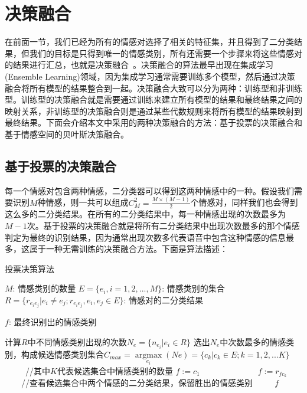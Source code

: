 \section{决策融合}
\label{sec:decision_fusion}
在前面一节，我们已经为所有的情感对选择了相关的特征集，并且得到了二分类结果，但我们的目标是只得到唯一的情感类别，所有还需要一个步骤来将这些情感对的结果进行汇总，也就是决策融合~\cite{Dasarathy1994Decision}。决策融合的算法最早出现在集成学习(Ensemble Learning)领域，因为集成学习通常需要训练多个模型，然后通过决策融合将所有模型的结果整合到一起。决策融合大致可以分为两种：训练型和非训练型。训练型的决策融合就是需要通过训练来建立所有模型的结果和最终结果之间的映射关系，非训练型的决策融合则是通过某些代数规则来将所有模型的结果映射到最终结果。下面会介绍本文中采用的两种决策融合的方法：基于投票的决策融合和基于情感空间的贝叶斯决策融合。

\subsection{基于投票的决策融合}
\label{ssec:voting_decision_fusion}
每一个情感对包含两种情感，二分类器可以得到这两种情感中的一种。假设我们需要识别$M$种情感，则一共可以组成$C_M^2 = \frac{M \times (M - 1)}{2}$个情感对，同样我们也会得到这么多的二分类结果。在所有的二分类结果中，每一种情感出现的次数最多为$M-1$次。基于投票的决策融合就是将所有二分类结果中出现次数最多的那个情感判定为最终的识别结果，因为通常出现次数多代表语音中包含这种情感的信息最多，这属于一种无需训练的决策融合方法。下面是算法描述：

\begin{algorithm}[htb]
    \caption{投票决策算法}
    \label{alg:voting}
    
    \begin{algorithmic}[1]
        \Require %
            \Statex $M$: 情感类别的数量 
            \Statex $E = \{e_i, i=1,2,...,M\}$: 情感类别的集合
            \Statex $R = \{r_{e_ie_j}|e_i \neq e_j; r_{e_ie_j}, e_i, e_j \in E\}$: 情感对的二分类结果

        \Ensure %
            \Statex $f$: 最终识别出的情感类别

        \Statex
        \State  计算$R$中不同情感类别出现的次数$N_e = \{n_{e_i}|e_i \in R\}$ %
        \State  选出$N_e$中次数最多的情感类别，构成候选情感类别集合$C_{max} = \mathop{argmax}\limits_{e_i}(Ne) = \{c_k|c_k \in E; k = 1,2,...K\}$~~~~~//其中$K$代表候选集合中情感类别的数量
        \State  $f := c_1$
                \State $f := r_{fc_k}$~~~~//查看候选集合中两个情感的二分类结果，保留胜出的情感类别
            \EndFor
    　　 \EndIf
        \State \Return $f$
    \end{algorithmic}
\end{algorithm}

